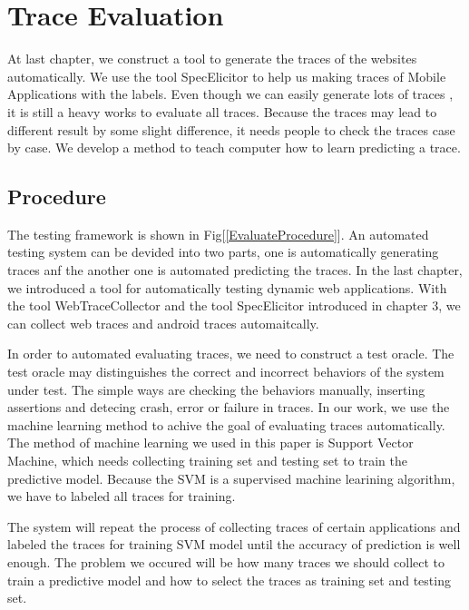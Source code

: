 
\chapter{Trace Evaluation}\label{ch:traceEvaluation}

At last chapter, we construct a tool to generate the traces of the websites automatically.
We use the tool SpecElicitor to help us making traces of Mobile Applications with the labels.
Even though we can easily generate lots of traces ,
it is still a heavy works to evaluate all traces.
Because the traces may lead to different result by some slight difference,
it needs people to check the traces case by case.
We develop a method to teach computer how to learn predicting a trace.


\section{Procedure}

The testing framework is shown in Fig[\ref{EvaluateProcedure}].
An automated testing system can be devided into two parts,
one is automatically generating traces anf the another one is automated predicting the traces.
In the last chapter, we introduced a tool for automatically testing dynamic web applications.
With the tool WebTraceCollector and the tool SpecElicitor introduced in chapter 3,
we can collect web traces and android traces automaitcally.

In order to automated evaluating traces,
we need to construct a test oracle.
The test oracle may distinguishes the correct and incorrect behaviors of the system under test.
The simple ways are checking the behaviors manually, inserting assertions and detecing crash, error or failure in traces.
In our work, we use the machine learning method to achive the goal of evaluating traces automatically.
The method of machine learning we used in this paper is Support Vector Machine,
which needs collecting training set and testing set to train the predictive model.
Because the SVM is a supervised machine learining algorithm,
we have to labeled all traces for training.

The system will repeat the process of collecting traces of certain applications
and labeled the traces for training SVM model
until the accuracy of prediction is well enough.
The problem we occured will be how many traces we should collect to train a predictive model and
how to select the traces as training set and testing set.

